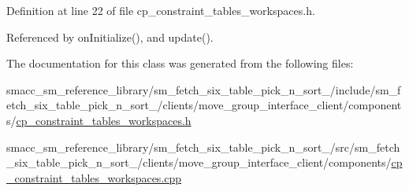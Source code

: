 Definition at line 22 of file cp\+\_\+constraint\+\_\+tables\+\_\+workspaces.\+h.



Referenced by on\+Initialize(), and update().



The documentation for this class was generated from the following files\+:\begin{DoxyCompactItemize}
\item 
smacc\+\_\+sm\+\_\+reference\+\_\+library/sm\+\_\+fetch\+\_\+six\+\_\+table\+\_\+pick\+\_\+n\+\_\+sort\+\_/include/sm\+\_\+fetch\+\_\+six\+\_\+table\+\_\+pick\+\_\+n\+\_\+sort\+\_/clients/move\+\_\+group\+\_\+interface\+\_\+client/components/\hyperlink{cp__constraint__tables__workspaces_8h}{cp\+\_\+constraint\+\_\+tables\+\_\+workspaces.\+h}\item 
smacc\+\_\+sm\+\_\+reference\+\_\+library/sm\+\_\+fetch\+\_\+six\+\_\+table\+\_\+pick\+\_\+n\+\_\+sort\+\_/src/sm\+\_\+fetch\+\_\+six\+\_\+table\+\_\+pick\+\_\+n\+\_\+sort\+\_/clients/move\+\_\+group\+\_\+interface\+\_\+client/components/\hyperlink{cp__constraint__tables__workspaces_8cpp}{cp\+\_\+constraint\+\_\+tables\+\_\+workspaces.\+cpp}\end{DoxyCompactItemize}
